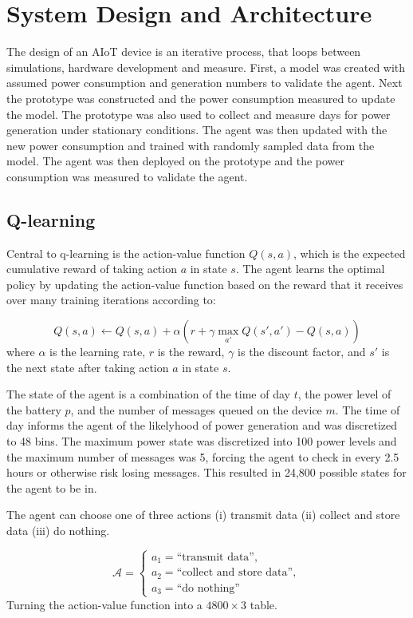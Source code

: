 \documentclass[10pt]{cai}
\begin{document}
\section{System Design and Architecture}

The design of an AIoT device is an iterative process, that loops between simulations, hardware development and measure.
First, a model was created with assumed power consumption and generation numbers to validate the agent.
Next the prototype was constructed and the power consumption measured to update the model.
The prototype was also used to collect and measure days for power generation under stationary conditions.
The agent was then updated with the new power consumption and trained with randomly sampled data from the model.
The agent was then deployed on the prototype and the power consumption was measured to validate the agent.

\subsection{Q-learning}

Central to q-learning is the action-value function $Q(s,a)$, which is the expected cumulative reward of taking action $a$ in state $s$.
The agent learns the optimal policy by updating the action-value function based on the reward that it receives over many training iterations according to:

\begin{equation}
  Q(s,a) \leftarrow Q(s,a) + \alpha \left( r + \gamma \max_{a'} Q(s',a') - Q(s,a) \right)
\end{equation}
where $\alpha$ is the learning rate, $r$ is the reward, $\gamma$ is the discount factor, and $s'$ is the next state after taking action $a$ in state $s$.

The state of the agent is a combination of the time of day $t$, the power level of the battery $p$, and the number of messages queued on the device $m$.
The time of day informs the agent of the likelyhood of power generation and was discretized to 48 bins.
The maximum power state was discretized into 100 power levels and the maximum number of messages was 5, forcing the agent to check in every 2.5 hours or otherwise risk losing messages.
This resulted in 24,800 possible states for the agent to be in.

The agent can choose one of three actions (i) transmit data (ii) collect and store data (iii) do nothing.

\begin{equation}
  \mathcal{A} = \left\{
  \begin{array}{l}
  a_1 = \text{``transmit data''}, \\
  a_2 = \text{``collect and store data''}, \\
  a_3 = \text{``do nothing''}
  \end{array}
  \right.
  \end{equation}
Turning the action-value function into a $4800 \times 3$ table.
  
\end{document}
